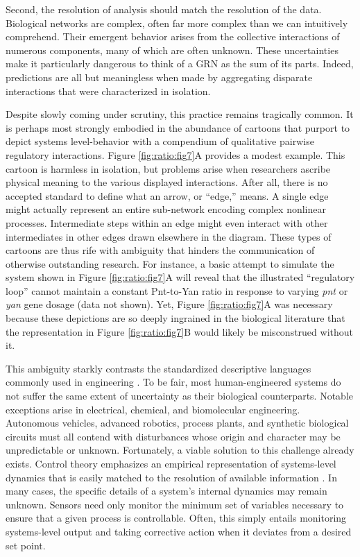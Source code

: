 Second, the resolution of analysis should match the resolution of the data. Biological networks are complex, often far more complex than we can intuitively comprehend. Their emergent behavior arises from the collective interactions of numerous components, many of which are often unknown. These uncertainties make it particularly dangerous to think of a GRN as the sum of its parts. Indeed, predictions are all but meaningless when made by aggregating disparate interactions that were characterized in isolation.

Despite slowly coming under scrutiny, this practice remains tragically common. It is perhaps most strongly embodied in the abundance of cartoons that purport to depict systems level-behavior with a compendium of qualitative pairwise regulatory interactions. Figure \ref{fig:ratio:fig7}A provides a modest example. This cartoon is harmless in isolation, but problems arise when researchers ascribe physical meaning to the various displayed interactions. After all, there is no accepted standard to define what an arrow, or ``edge,'' means. A single edge might actually represent an entire sub-network encoding complex nonlinear processes. Intermediate steps within an edge might even interact with other intermediates in other edges drawn elsewhere in the diagram. These types of cartoons are thus rife with ambiguity that hinders the communication of otherwise outstanding research. For instance, a basic attempt to simulate the system shown in Figure \ref{fig:ratio:fig7}A will reveal that the illustrated ``regulatory loop'' cannot maintain a constant Pnt-to-Yan ratio in response to varying \textit{pnt} or \textit{yan} gene dosage (data not shown). Yet, Figure \ref{fig:ratio:fig7}A was necessary because these depictions are so deeply ingrained in the biological literature that the representation in Figure \ref{fig:ratio:fig7}B would likely be misconstrued without it.

This ambiguity starkly contrasts the standardized descriptive languages commonly used in engineering \cite{Lazebnik2004}. To be fair, most human-engineered systems do not suffer the same extent of uncertainty as their biological counterparts. Notable exceptions arise in electrical, chemical, and biomolecular engineering. Autonomous vehicles, advanced robotics, process plants, and synthetic biological circuits must all contend with disturbances whose origin and character may be unpredictable or unknown. Fortunately, a viable solution to this challenge already exists. Control theory emphasizes an empirical representation of systems-level dynamics that is easily matched to the resolution of available information \cite{Seborg2011}. In many cases, the specific details of a system's internal dynamics may remain unknown. Sensors need only monitor the minimum set of variables necessary to ensure that a given process is controllable. Often, this simply entails monitoring systems-level output and taking corrective action when it deviates from a desired set point. 

